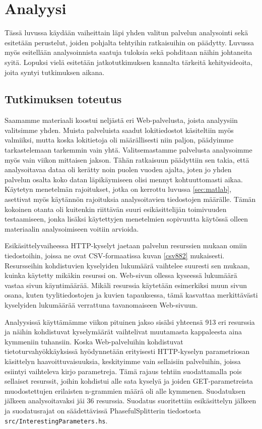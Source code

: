 
\chapter{Analyysi}

Tässä luvussa käydään vaiheittain läpi yhden valitun palvelun analysointi sekä esitetään perustelut, joiden pohjalta tehtyihin ratkaisuihin on päädytty. 
Luvussa myös esitellään analysoinnista saatuja tuloksia sekä pohditaan näihin johtaneita syitä. Lopuksi vielä esitetään jatkotutkimuksen kannalta 
tärkeitä kehitysideoita, joita syntyi tutkimuksen aikana. 
 
\section{Tutkimuksen toteutus}

Saamamme materiaali koostui neljästä eri Web-palvelusta, joista analyysiin valitsimme yhden. Muista palveluista saadut lokitiedostot käsiteltiin
myös valmiiksi, mutta koska lokitietoja oli määrällisesti niin paljon, päädyimme tarkastelemaan tarkemmin vain yhtä. Valitsemastamme palvelusta
analysoimme myös vain viikon mittaisen jakson. Tähän ratkaisuun päädyttiin sen takia, että analysoitavaa dataa oli kerätty noin puolen vuoden ajalta,
joten jo yhden palvelun osalta koko datan läpikäymiseen olisi mennyt kohtuuttomasti aikaa. Käytetyn menetelmän rajoitukset, jotka on kerrottu luvussa \ref{sec:matlab},
asettivat myös käytännön rajoituksia analysoitavien tiedostojen määrälle. Tämän kokoinen otanta oli kuitenkin riittävän suuri esikäsittelijän toimivuuden
testaamiseen, jonka lisäksi käytettyjen menetelmien sopivuutta käytössä olleen materiaalin analysoimiseen voitiin arvioida. 

Esikäsittelyvaiheessa HTTP-kyselyt jaetaan palvelun resurssien mukaan
omiin tiedostoihin, joissa ne ovat CSV-formaatissa kuvan \ref{csv882}
mukaisesti.  Resursseihin kohdistuvien kyselyiden lukumäärä vaihtelee
suuresti sen mukaan, kuinka käytetty mikäkin resurssi on. Web-sivun
ollessa kyseessä lukumäärä vastaa sivun käyntimäärää. Mikäli resurssia
käytetään esimerkiksi muun sivun osana, kuten tyylitiedostojen ja
kuvien tapauksessa, tämä kasvattaa merkittävästi kyselyiden lukumäärää
verrattuna tavanomaiseen Web-sivuun.

Analyysissä käyttämämme viikon pituinen jakso sisälsi yhteensä 913 eri
resurssia ja näihin kohdistuvat kyselymäärät vaihtelivat muutamasta
kappaleesta aina kymmeniin tuhansiin. Koska Web-palveluihin kohdistuvat 
tietoturvahyökkäyksissä hyödynnetään erityisesti HTTP-kyselyn parametriosan 
käsittelyn haavoittuvaisuuksia, keskityimme vain sellaisiin palveluihin, joissa 
esiintyi vaihteleva kirjo parametreja. Tämä rajaus tehtiin suodattamalla pois sellaiset
resurssit, joihin kohdistui alle sata kyselyä ja joiden
GET-parametreista muodostettujen erilaisten n-grammien määrä oli alle
kymmenen. Suodatuksen jälkeen analysoitavaksi jäi 36
resurssia. Suodatus suoritettiin esikäsittelyn jälkeen ja
suodatusrajat on säädettävissä PhasefulSplitterin tiedostosta
\texttt{src/InterestingParameters.hs}.

